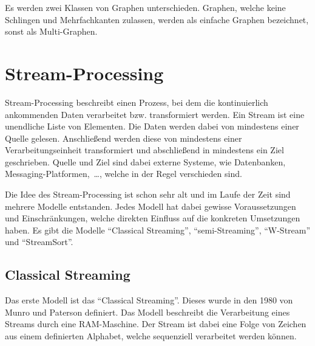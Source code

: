 
Es werden zwei Klassen von Graphen unterschieden. Graphen, welche keine
Schlingen und Mehrfachkanten zulassen, werden als einfache Graphen bezeichnet,
sonst als Multi-Graphen.


\section{Stream-Processing}
Stream-Processing beschreibt einen Prozess, bei dem die kontinuierlich
ankommenden Daten verarbeitet bzw. transformiert werden. Ein Stream ist eine
unendliche Liste von Elementen. Die Daten werden dabei von mindestens einer
Quelle gelesen. Anschließend werden diese von mindestens einer Verarbeitungseinheit
transformiert und abschließend in mindestens ein Ziel geschrieben. Quelle und
Ziel sind dabei externe Systeme, wie Datenbanken, Messaging-Platformen,~\dots,
welche in der Regel verschieden sind.

Die Idee des Stream-Processing ist schon sehr alt und im Laufe der Zeit sind
mehrere Modelle entstanden. Jedes Modell hat dabei gewisse Voraussetzungen
und Einschränkungen, welche direkten Einfluss auf die konkreten Umsetzungen
haben. Es gibt die Modelle \enquote{Classical Streaming}, \enquote{semi-Streaming},
\enquote{W-Stream} und \enquote{StreamSort}.

\subsection{Classical Streaming}
Das erste Modell ist das \enquote{Classical Streaming}. Dieses wurde in den
1980 von Munro und Paterson definiert. Das Modell beschreibt die Verarbeitung
eines Streams durch eine \gls{RAM}-Maschine. Der Stream ist dabei eine Folge von
Zeichen aus einem definierten Alphabet, welche sequenziell verarbeitet werden
können.

